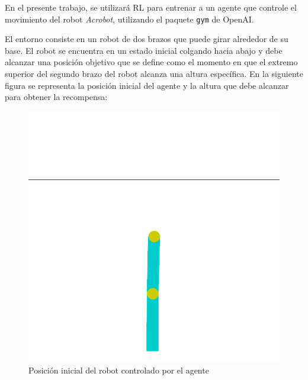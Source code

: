 \documentclass[12pt]{article}
\begin{document}
	En el presente trabajo, se utilizará RL para entrenar a un agente que controle el movimiento del robot \textit{Acrobot}, utilizando el paquete \texttt{gym} de OpenAI. 
	
	El entorno consiste en un robot de dos brazos que puede girar alrededor de su base. El robot se encuentra en un estado inicial colgando hacia abajo y debe alcanzar una posición objetivo que se define como el momento en que el extremo superior del segundo brazo del robot alcanza una altura específica. En la siguiente figura se representa la posición inicial del agente y la altura que debe alcanzar para obtener la recompensa:
	
	\begin{figure}[H]
		\centering
		\includegraphics[width = 0.5\linewidth]{Imagenes/acrobot0.png}
		\caption{Posición inicial del robot controlado por el agente}
		\label{f:acrobot0}
	\end{figure}
	
\end{document}
